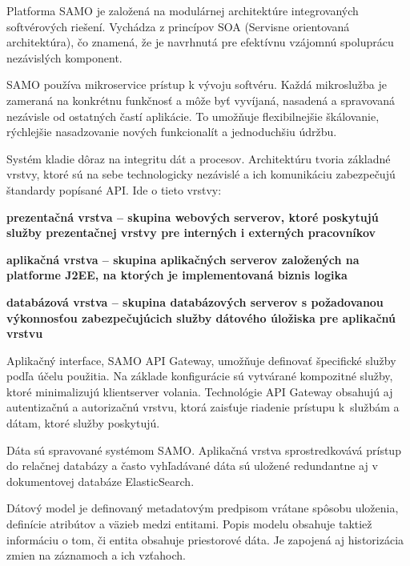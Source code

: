 Platforma SAMO je založená na modulárnej architektúre integrovaných softvérových riešení. Vychádza z princípov SOA (Servisne orientovaná architektúra), čo znamená, že je navrhnutá pre efektívnu vzájomnú spoluprácu nezávislých komponent. %

SAMO používa mikroservice prístup k vývoju softvéru. Každá mikroslužba je zameraná na konkrétnu funkčnosť a môže byť vyvíjaná, nasadená a spravovaná nezávisle od ostatných častí aplikácie. To umožňuje flexibilnejšie škálovanie, rýchlejšie nasadzovanie nových funkcionalít a jednoduchšiu údržbu. %

\blank
Systém kladie dôraz na integritu dát a procesov. Architektúru tvoria základ\-né vrstvy, ktoré sú na sebe technologicky nezávislé a ich komunikáciu zabezpečujú štandardy popísané API. Ide o tieto vrstvy:

\startitemize[n]
\item \start\bf prezentačná vrstva \stop -- skupina webových serverov, ktoré poskytujú služby prezentačnej vrstvy pre interných i externých pracovníkov
\item \start\bf aplikačná vrstva \stop -- skupina aplikačných serverov založených na platforme J2EE, na ktorých je implementovaná biznis logika
\item  \start\bf databázová vrstva \stop -- skupina databázových serverov s požadovanou výkonnosťou zabezpečujúcich služby dátového úložiska pre aplikačnú vrstvu
\stopitemize

Aplikačný interface, SAMO API Gateway, umožňuje definovať špecifické služby podľa účelu použitia. Na základe konfigurácie sú vytvárané kompozitné služby, ktoré minimalizujú klient\ip server volania. Technológie API Gateway obsahujú aj autentizačnú a autorizačnú vrstvu, ktorá zaisťuje riadenie prístupu k~službám a dátam, ktoré služby poskytujú.

Dáta sú spravované systémom SAMO. Aplikačná vrstva sprostredkovává prístup do relačnej databázy a často vyhľadávané dáta sú uložené redundantne aj v dokumentovej databáze ElasticSearch. 

Dátový model je definovaný metadatovým predpisom vrátane spôsobu uloženia, definície atribútov a väzieb medzi entitami. Popis modelu obsahuje taktiež informáciu o tom, či entita obsahuje priestorové dáta. Je zapojená aj historizácia zmien na záznamoch a ich vzťahoch.

